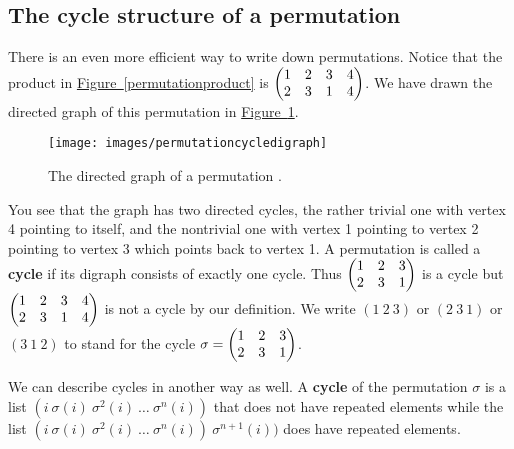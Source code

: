 \documentclass[10pt,]{book}
\newcommand{\terminology}[1]{\textbf{#1}}
\theoremstyle{plain}
\theoremstyle{definition}
\theoremstyle{definition}
\numberwithin{equation}{chapter}
\newcommand{\amp}{&}
\begin{document}
\subsection[{The cycle structure of a permutation}]{The cycle structure of a permutation}\label{subsection-56}
There is an even more efficient way to write down permutations. Notice that the product in \hyperref[permutationproduct]{Figure~\ref{permutationproduct}} is \(\begin{pmatrix}1\amp 2\amp 3\amp 4\cr2\amp 3\amp 1\amp 4
\end{pmatrix}\). We have drawn the directed graph of this permutation in \hyperref[permutationcycledigraph]{Figure~\ref{permutationcycledigraph}}.%
\begin{figure}
\centering
\texttt{[image: images/permutationcycledigraph]}
\caption{The directed graph of a permutation .\label{permutationcycledigraph}}
\end{figure}
You see that the graph has two directed cycles, the rather trivial one with vertex 4 pointing to itself, and the nontrivial one with vertex 1 pointing to vertex 2 pointing to vertex 3 which points back to vertex 1. A permutation is called a \terminology{cycle} if its digraph consists of exactly one cycle. Thus \(\begin{pmatrix}1\amp 2\amp 3\cr2\amp 3\amp 1
\end{pmatrix}\) is a cycle but \(\begin{pmatrix}1\amp 2\amp 3\amp 4\cr2\amp 3\amp 1\amp 4
\end{pmatrix}\) is not a cycle by our definition. We write \((1\ 2\ 3)\) or \((2\ 3\ 1)\) or \((3\ 1\ 2)\) to stand for the cycle \(\sigma =\begin{pmatrix}1\amp 2\amp 3\cr2\amp 3\amp 1
\end{pmatrix}\).%
\par
We can describe cycles in another way as well. A \terminology{cycle} of the permutation \(\sigma\) is a list \((i\
\sigma(i)\
\sigma^2(i)
\ \ldots\
\sigma^n(i))\) that does not have repeated elements while the list \((i\ \sigma(i)\
\sigma^2(i)\ \ldots\ \sigma^n(i))\ \sigma^{n+1}(i))\) does have repeated elements.%
\end{document}
